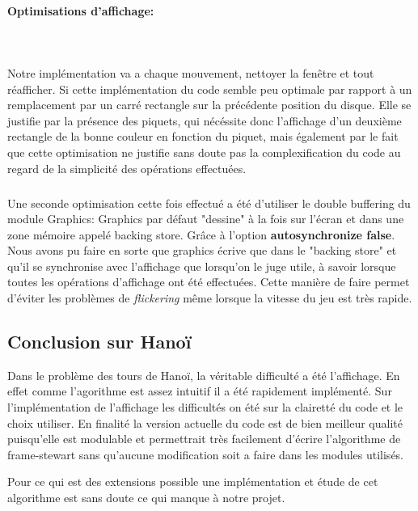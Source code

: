 \documentclass[a4paper,11pt]{article}
\begin{document}
\paragraph{Optimisations d'affichage:}\mbox{}\\\\
Notre implémentation va a chaque mouvement, nettoyer la fenêtre et tout réafficher.
Si cette implémentation du code semble peu optimale par rapport à un remplacement par un carré rectangle sur la précédente position du disque.
Elle se justifie par la présence des piquets, qui nécéssite donc l'affichage d'un deuxième rectangle de la bonne couleur en fonction du piquet, mais également par le fait que cette optimisation ne justifie sans doute pas la complexification du code au regard de la simplicité des opérations effectuées.
\subparagraph{}
Une seconde optimisation cette fois effectué a été d'utiliser le double buffering du module Graphics:
Graphics par défaut "dessine" à la fois sur l'écran et dans une zone mémoire appelé backing store.
Grâce à l'option \textbf{autosynchronize false}.
Nous avons pu faire en sorte que graphics écrive que dans le "backing store" et qu'il se synchronise avec l'affichage que lorsqu'on le juge utile, à savoir lorsque toutes les opérations d'affichage ont été effectuées.
Cette manière de faire permet d'éviter les problèmes de \textit{flickering} même lorsque la vitesse du jeu est très rapide.
\subsection{Conclusion sur Hanoï}
Dans le problème des tours de Hanoï, la véritable difficulté a été l'affichage. 
En effet comme l'agorithme est assez intuitif il a été rapidement implémenté.
Sur l'implémentation de l'affichage les difficultés on été sur la clairetté du code et le choix utiliser.
En finalité la version actuelle du code est de bien meilleur qualité puisqu'elle est modulable et permettrait très facilement d'écrire l'algorithme de frame-stewart sans qu'aucune modification soit a faire dans les modules utilisés.

Pour ce qui est des extensions possible une implémentation et étude de cet algorithme est sans doute ce qui manque à notre projet.
 
\end{document}
